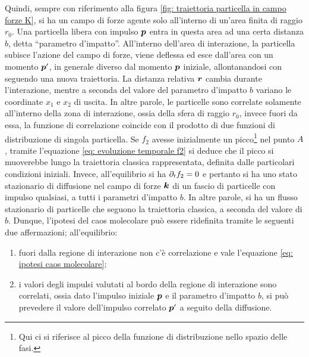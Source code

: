 Quindi, sempre con riferimento alla figura \ref{fig: traiettoria particella in campo forze K}, si ha un campo di forze agente solo all'interno di un'area finita di raggio $r_0$. Una particella libera con impulso $\bm{p}$ entra in questa area ad una certa distanza $b$, detta ``parametro d'impatto''. All'interno dell'area di interazione, la particella subisce l'azione del campo di forze, viene deflessa ed esce dall'area con un momento $\bm{p}'$, in generale diverso dal momento $\bm{p}$ iniziale, allontanandosi con seguendo una nuova traiettoria. La distanza relativa $\bm{r}$ cambia durante l'interazione, mentre a seconda del valore del parametro d'impatto $b$ variano le coordinate $x_1$ e $x_2$ di uscita. In altre parole, le particelle sono correlate solamente all'interno della zona di interazione, ossia della sfera di raggio $r_0$, invece fuori da essa, la funzione di correlazione coincide con il prodotto di due funzioni di distribuzione di singola particella. Se $f_2$ avesse inizialmente un picco\footnote{Qui ci si riferisce al picco della funzione di distribuzione nello spazio delle fasi.} nel punto $A$, tramite l'equazione \eqref{eq: evoluzione temporale f2} si deduce che il picco si muoverebbe lungo la traiettoria classica rappresentata, definita dalle particolari condizioni iniziali. Invece, all'equilibrio si ha $\partial_tf_2 = 0$ e pertanto si ha uno stato stazionario di diffusione nel campo di forze $\bm{k}$ di un fascio di particelle con impulso qualsiasi, a tutti i parametri d'impatto $b$. In altre parole, si ha un flusso stazionario di particelle che seguono la traiettoria classica, a seconda del valore di $b$. Dunque, l'ipotesi del caos molecolare può essere ridefinita tramite le seguenti due affermazioni; all'equilibrio:
\begin{enumerate}
    \item fuori dalla regione di interazione non c'è correlazione e vale l'equazione \eqref{eq: ipotesi caos molecolare};
    \item i valori degli impulsi valutati al bordo della regione di interazione sono correlati, ossia dato l'impulso iniziale $\bm{p}$ e il parametro d'impatto $b$, si può prevedere il valore dell'impulso correlato $\bm{p}'$ a seguito della diffusione.
\end{enumerate}

